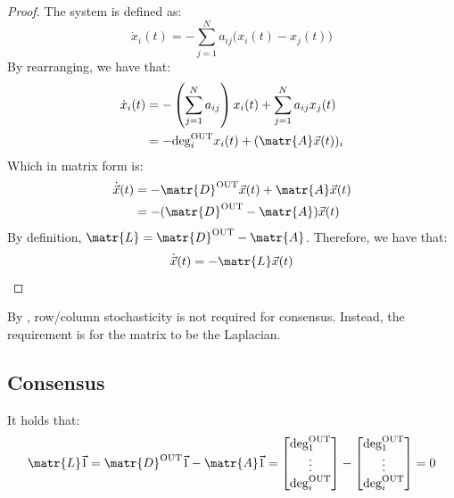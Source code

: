 \begin{description}
\begin{theorem}
            \begin{proof}
                The system is defined as:
                \[
                    \dot{x}_i(t) = - \sum_{j=1}^{N} a_{ij} \Big( x_i(t) - x_j(t) \Big)  
                \]
                By rearranging, we have that:
                \[
                    \begin{split}
                        \dot{x}_i(t) 
                            &= - \left( \sum_{j=1}^{N} a_{ij} \right) x_i(t) + \sum_{j=1}^{N} a_{ij} x_j(t) \\
                            &= -\outdeg[i] x_i(t) + (\matr{A}\vec{x}(t))_i
                    \end{split}
                \]
                Which in matrix form is:
                \[ 
                    \begin{split}
                        \dot{\vec{x}}(t) 
                            &= - \matr{D}^\text{OUT} \vec{x}(t) + \matr{A} \vec{x}(t) \\
                            &= - (\matr{D}^\text{OUT} - \matr{A}) \vec{x}(t) 
                    \end{split}
                \]
                By definition, $\matr{L} = \matr{D}^\text{OUT} - \matr{A}$. Therefore, we have that:
                \[ \dot{\vec{x}}(t) = - \matr{L} \vec{x}(t) \]  
            \end{proof}
        \end{theorem}

        \begin{remark}
            By , row/column stochasticity is not required for consensus. Instead, the requirement is for the matrix to be the Laplacian.
        \end{remark}
\end{description}


\subsection{Consensus}

\begin{lemma}
    It holds that:
    \[
        \matr{L}\vec{1} 
        = \matr{D}^\text{OUT} \vec{1} - \matr{A}\vec{1}
        = \begin{bmatrix} \outdeg[1] \\ \vdots \\ \outdeg[i] \end{bmatrix} - \begin{bmatrix} \outdeg[1] \\ \vdots \\ \outdeg[i] \end{bmatrix}
        = 0
    \]
\end{lemma}


